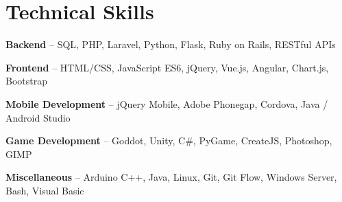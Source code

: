 \section{Technical Skills}
\begin{small}
	\parbox[t][][t]{\linewidth}{
		\textbf{Backend} -- SQL, PHP, Laravel, Python, Flask, Ruby on Rails, RESTful APIs
		\smallbreak
	}
	\parbox[t][][t]{\linewidth}{
	\textbf{Frontend} -- HTML/CSS, JavaScript ES6, jQuery, Vue.js, Angular, Chart.js, Bootstrap
	\smallbreak
}
	\parbox[t][][t]{\linewidth}{
		\textbf{Mobile Development} -- jQuery Mobile, Adobe Phonegap, Cordova, Java / Android Studio
		\smallbreak
	}
	\parbox[t][][t]{\linewidth}{
		\textbf{Game Development} -- Goddot, Unity, C\#, PyGame, CreateJS, Photoshop, GIMP
		\smallbreak
	}
	\parbox[t][][t]{\linewidth}{
	\textbf{Miscellaneous} -- Arduino C++, Java, Linux, Git, Git Flow, Windows Server, Bash, Visual Basic
}
\end{small}
